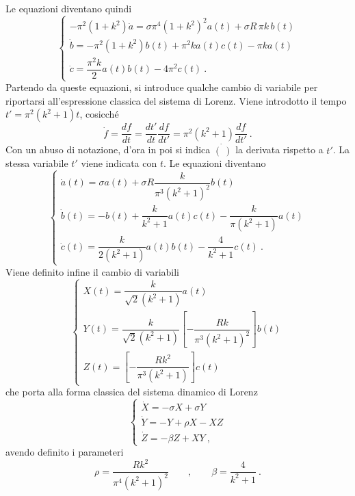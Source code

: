 %
\noindent
Le equazioni diventano quindi
\begin{equation}
    \begin{cases}
   - \pi^2 (1+k^2) \dot{a} = \sigma \pi^4 (1+k^2)^2 a(t) +  \sigma R \, \pi k \, b(t) \\
    \dot{b} = -\pi^2 (1+k^2) b(t) + \pi^2 k a(t)c(t)  - \pi k a(t)  \\
    \dot{c} = \dfrac{\pi^2 k}{2} a(t) b(t) - 4 \pi^2 c(t) \ .
    \end{cases}
\end{equation}
Partendo da queste equazioni, si introduce qualche cambio di variabile per riportarsi all'espressione classica del sistema di Lorenz.
Viene introdotto il tempo $t' = \pi^2 (k^2 + 1) t$, cosicché
\begin{equation}
    \dot{f} = \dfrac{df}{dt} = \dfrac{dt'}{dt}\dfrac{df}{dt'} =
    \pi^2 (k^2 + 1) \dfrac{df}{dt'} \ .
\end{equation}
Con un abuso di notazione, d'ora in poi si indica $\dot{(\ )}$ la derivata rispetto a $t'$. La stessa variabile $t'$ viene indicata con $t$. Le equazioni diventano
\begin{equation}
    \begin{cases}
    \dot{a}(t) = \sigma a(t) +  \sigma R \dfrac{k}{\pi^3 (k^2+1)^2} b(t) \\
    \dot{b}(t) = - b(t) + \dfrac{ k}{k^2+1} a(t)c(t)  - \dfrac{ k}{\pi(k^2+1)} a(t)  \\
    \dot{c}(t) = \dfrac{k}{2(k^2+1)} a(t) b(t) - \dfrac{4}{k^2+1}  c(t) \ .
    \end{cases}
\end{equation}
Viene definito infine il cambio di variabili 
\begin{equation}
    \begin{cases}
     X(t) = \dfrac{k}{\sqrt{2}(k^2+1)} a(t) \\
     Y(t) = \dfrac{k}{\sqrt{2}(k^2+1)}
     \left[-\dfrac{R k}{\pi^3 (k^2+1)^2}\right] b(t) \\
     Z(t) = \left[-\dfrac{R k^2}{\pi^3 (k^2+1)}\right] c(t)
    \end{cases}
\end{equation}
che porta alla forma classica del sistema dinamico di Lorenz
\begin{equation}
    \begin{cases}
      \dot{X} = - \sigma X + \sigma Y \\
      \dot{Y} = - Y + \rho X - X Z \\
      \dot{Z} = - \beta Z + X Y \ ,
    \end{cases}
\end{equation}
avendo definito i parameteri 
\begin{equation}
    \rho = \dfrac{R k^2}{\pi^4 (k^2+1)^2} \qquad , \qquad
    \beta = \dfrac{4}{k^2+1} \ .
\end{equation}

